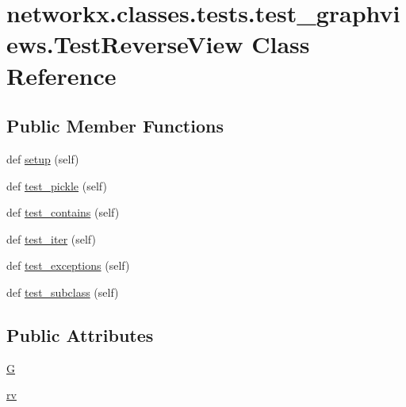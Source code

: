 \hypertarget{classnetworkx_1_1classes_1_1tests_1_1test__graphviews_1_1TestReverseView}{}\section{networkx.\+classes.\+tests.\+test\+\_\+graphviews.\+Test\+Reverse\+View Class Reference}
\label{classnetworkx_1_1classes_1_1tests_1_1test__graphviews_1_1TestReverseView}
\subsection*{Public Member Functions}
\begin{DoxyCompactItemize}
\item 
def \hyperlink{classnetworkx_1_1classes_1_1tests_1_1test__graphviews_1_1TestReverseView_a9b228b4e8aa3ede442f45aa2bba29846}{setup} (self)
\item 
def \hyperlink{classnetworkx_1_1classes_1_1tests_1_1test__graphviews_1_1TestReverseView_ac6a5df913cdc59ce8503ee2e85807055}{test\+\_\+pickle} (self)
\item 
def \hyperlink{classnetworkx_1_1classes_1_1tests_1_1test__graphviews_1_1TestReverseView_ab4e7e206553c9c369a14919d1426178d}{test\+\_\+contains} (self)
\item 
def \hyperlink{classnetworkx_1_1classes_1_1tests_1_1test__graphviews_1_1TestReverseView_a6d98e811fb3433a23b8ad76ca4770f2c}{test\+\_\+iter} (self)
\item 
def \hyperlink{classnetworkx_1_1classes_1_1tests_1_1test__graphviews_1_1TestReverseView_a684094218bc9e86df7532f52a075cb62}{test\+\_\+exceptions} (self)
\item 
def \hyperlink{classnetworkx_1_1classes_1_1tests_1_1test__graphviews_1_1TestReverseView_a1ad063c3458aba3134186890d4c52386}{test\+\_\+subclass} (self)
\end{DoxyCompactItemize}
\subsection*{Public Attributes}
\begin{DoxyCompactItemize}
\item 
\hyperlink{classnetworkx_1_1classes_1_1tests_1_1test__graphviews_1_1TestReverseView_ad9da71af9fda067bed9818bce8f3c96f}{G}
\item 
\hyperlink{classnetworkx_1_1classes_1_1tests_1_1test__graphviews_1_1TestReverseView_a318165c95c318499e84c8db7acd94069}{rv}
\end{DoxyCompactItemize}


